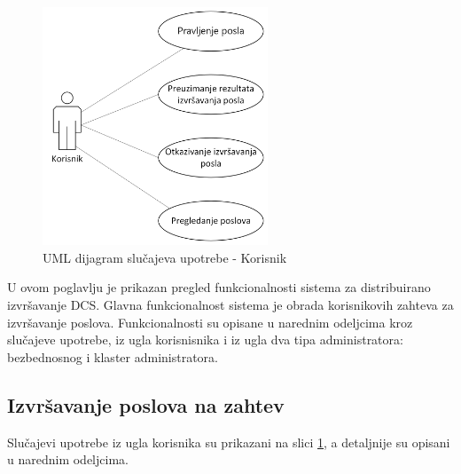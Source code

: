 \documentclass[12pt,oneside]{memoir}
\begin{document}
\begin{figure}[!ht]
  \centering
  \includegraphics[width=0.6\textwidth]{./images/dijagram_slucajeva_upotrebe_korisnik.png}
  \caption{UML dijagram slučajeva upotrebe - Korisnik}
  \label{fig:slucajupotrebe_korisnik}
\end{figure}



U ovom poglavlju je prikazan pregled funkcionalnosti sistema za distribuirano izvršavanje DCS. 
Glavna funkcionalnost sistema je obrada korisnikovih zahteva za izvršavanje poslova. 
Funkcionalnosti su opisane u narednim odeljcima kroz slučajeve upotrebe, iz ugla korisnisnika i iz ugla dva tipa administratora: bezbednosnog i klaster administratora.

\subsection{Izvršavanje poslova na zahtev}
Slučajevi upotrebe iz ugla korisnika su prikazani na slici \ref{fig:slucajupotrebe_korisnik}, a detaljnije su opisani u narednim odeljcima.
\end{document}
